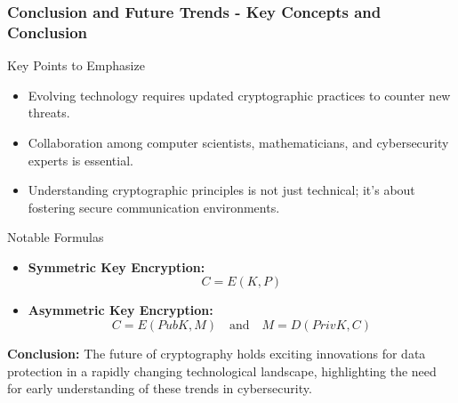 \documentclass{beamer}
\begin{document}
\begin{frame}[fragile]
    \frametitle{Conclusion and Future Trends - Key Concepts and Conclusion}
    \begin{block}{Key Points to Emphasize}
        \begin{itemize}
            \item Evolving technology requires updated cryptographic practices to counter new threats.
            \item Collaboration among computer scientists, mathematicians, and cybersecurity experts is essential.
            \item Understanding cryptographic principles is not just technical; it’s about fostering secure communication environments.
        \end{itemize}
    \end{block}
    
    \begin{block}{Notable Formulas}
        \begin{itemize}
            \item \textbf{Symmetric Key Encryption:} 
            \begin{equation}
                C = E(K, P)
            \end{equation}
            \item \textbf{Asymmetric Key Encryption:} 
            \begin{equation}
                C = E(PubK, M) \quad \text{and} \quad M = D(PrivK, C)
            \end{equation}
        \end{itemize}
    \end{block}

    \textbf{Conclusion:} The future of cryptography holds exciting innovations for data protection in a rapidly changing technological landscape, highlighting the need for early understanding of these trends in cybersecurity.
\end{frame}
\end{document}
